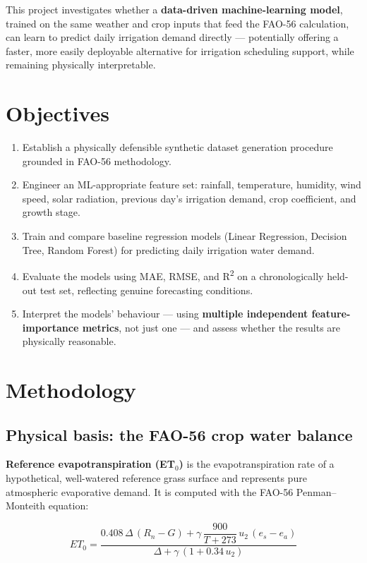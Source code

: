 \documentclass[11pt,a4paper]{article}
\begin{document}
This project investigates whether a \textbf{data-driven machine-learning model},
trained on the same weather and crop inputs that feed the FAO-56 calculation, can
learn to predict daily irrigation demand directly --- potentially offering a
faster, more easily deployable alternative for irrigation scheduling support,
while remaining physically interpretable.

\section{Objectives}

\begin{enumerate}[label=\arabic*.,leftmargin=2em]
    \item Establish a physically defensible synthetic dataset generation
    procedure grounded in FAO-56 methodology.
    \item Engineer an ML-appropriate feature set: rainfall, temperature,
    humidity, wind speed, solar radiation, previous day's irrigation demand,
    crop coefficient, and growth stage.
    \item Train and compare baseline regression models (Linear Regression,
    Decision Tree, Random Forest) for predicting daily irrigation water demand.
    \item Evaluate the models using MAE, RMSE, and R\textsuperscript{2} on a
    chronologically held-out test set, reflecting genuine forecasting
    conditions.
    \item Interpret the models' behaviour --- using \textbf{multiple
    independent feature-importance metrics}, not just one --- and assess
    whether the results are physically reasonable.
\end{enumerate}

\section{Methodology}

\subsection{Physical basis: the FAO-56 crop water balance}

\textbf{Reference evapotranspiration (ET$_0$)} is the evapotranspiration rate of
a hypothetical, well-watered reference grass surface and represents pure
atmospheric evaporative demand. It is computed with the FAO-56
Penman--Monteith equation:

\begin{equation}
ET_0 = \frac{0.408\,\Delta\,(R_n - G) + \gamma\,\dfrac{900}{T+273}\,u_2\,(e_s - e_a)}{\Delta + \gamma\,(1 + 0.34\,u_2)}
\label{eq:et0}
\end{equation}
\end{document}
